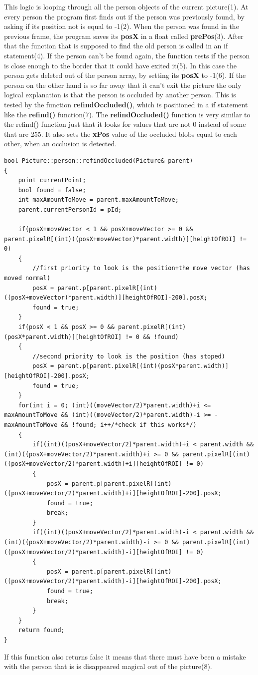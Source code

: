 This logic is looping through all the person objects of the current picture(1). At every person the program first finds out if the person was previously found, by asking if its position not is equal to -1(2). When the person was found in the previous frame, the program saves its \textbf{posX} in a float called \textbf{prePos}(3). After that the function that is supposed to find the old person is called in an if statement(4). If the person can't be found again, the function tests if the person is close enough to the border that it could have exited it(5). In this case the person gets deleted out of the person array, by setting its \textbf{posX} to -1(6). If the person on the other hand is so far away that it can't exit the picture the only logical explanation is that the person is occluded by another person. This is tested by the function \textbf{refindOccluded()}, which is positioned in a if statement like the \textbf{refind()} function(7). The \textbf{refindOccluded()} function is very similar to the refind() function just that it looks for values that are not 0 instead of some that are 255. It also sets the \textbf{xPos} value of the occluded blobs equal to each other, when an occlusion is detected.
\begin{lstlisting}
bool Picture::person::refindOccluded(Picture& parent)
{
	point currentPoint;
	bool found = false;
	int maxAmountToMove = parent.maxAmountToMove;
	parent.currentPersonId = pId;

	if(posX+moveVector < 1 && posX+moveVector >= 0 && parent.pixelR[(int)((posX+moveVector)*parent.width)][heightOfROI] != 0)
	{
		//first priority to look is the position+the move vector (has moved normal)
		posX = parent.p[parent.pixelR[(int)((posX+moveVector)*parent.width)][heightOfROI]-200].posX;
		found = true;
	} 
	if(posX < 1 && posX >= 0 && parent.pixelR[(int)(posX*parent.width)][heightOfROI] != 0 && !found)
	{
		//second priority to look is the position (has stoped)
		posX = parent.p[parent.pixelR[(int)(posX*parent.width)][heightOfROI]-200].posX;
		found = true;
	} 
	for(int i = 0; (int)((moveVector/2)*parent.width)+i <= maxAmountToMove && (int)((moveVector/2)*parent.width)-i >= -maxAmountToMove && !found; i++/*check if this works*/)
	{
		if((int)((posX+moveVector/2)*parent.width)+i < parent.width && (int)((posX+moveVector/2)*parent.width)+i >= 0 && parent.pixelR[(int)((posX+moveVector/2)*parent.width)+i][heightOfROI] != 0)
		{
			posX = parent.p[parent.pixelR[(int)((posX+moveVector/2)*parent.width)+i][heightOfROI]-200].posX;
			found = true;
			break;
		}
		if((int)((posX+moveVector/2)*parent.width)-i < parent.width && (int)((posX+moveVector/2)*parent.width)-i >= 0 && parent.pixelR[(int)((posX+moveVector/2)*parent.width)-i][heightOfROI] != 0)
		{
			posX = parent.p[parent.pixelR[(int)((posX+moveVector/2)*parent.width)-i][heightOfROI]-200].posX;
			found = true;
			break;
		}
	}
	return found;
}
\end{lstlisting}
If this function also returns false it means that there must have been a mistake with the person that is is disappeared magical out of the picture(8).

